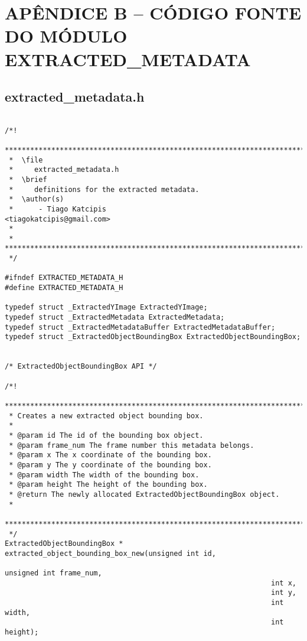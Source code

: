 \chapter{APÊNDICE B -- CÓDIGO FONTE DO MÓDULO EXTRACTED\_METADATA}

\section{extracted\_metadata.h}

\begin{lstlisting}

/*!
 *******************************************************************************
 *  \file
 *     extracted_metadata.h
 *  \brief
 *     definitions for the extracted metadata.
 *  \author(s)
 *      - Tiago Katcipis                             <tiagokatcipis@gmail.com>
 *
 * *****************************************************************************
 */

#ifndef EXTRACTED_METADATA_H
#define EXTRACTED_METADATA_H

typedef struct _ExtractedYImage ExtractedYImage;
typedef struct _ExtractedMetadata ExtractedMetadata;
typedef struct _ExtractedMetadataBuffer ExtractedMetadataBuffer;
typedef struct _ExtractedObjectBoundingBox ExtractedObjectBoundingBox;


/* ExtractedObjectBoundingBox API */

/*!
 *******************************************************************************
 * Creates a new extracted object bounding box.
 *
 * @param id The id of the bounding box object.
 * @param frame_num The frame number this metadata belongs.
 * @param x The x coordinate of the bounding box.
 * @param y The y coordinate of the bounding box.
 * @param width The width of the bounding box.
 * @param height The height of the bounding box.
 * @return The newly allocated ExtractedObjectBoundingBox object.
 *
 *******************************************************************************
 */
ExtractedObjectBoundingBox * extracted_object_bounding_box_new(unsigned int id, 
                                                               unsigned int frame_num, 
                                                               int x, 
                                                               int y, 
                                                               int width, 
                                                               int height);



\end{lstlisting}
